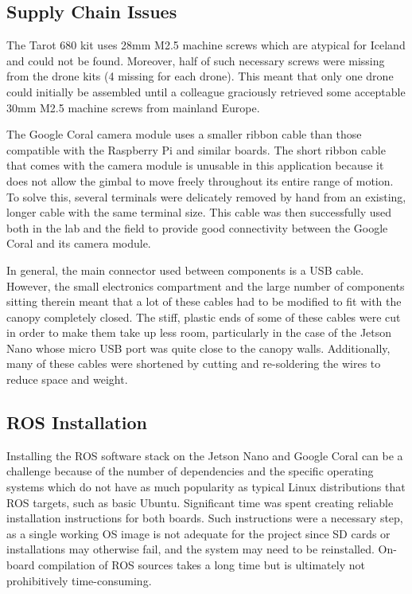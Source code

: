 \subsection{Supply Chain Issues}

The Tarot 680 kit uses 28mm M2.5 machine screws which are atypical for Iceland and could not be found. Moreover, half of such necessary screws were missing from the drone kits (4 missing for each drone). This meant that only one drone could initially be assembled until a colleague graciously retrieved some acceptable 30mm M2.5 machine screws from mainland Europe.

The Google Coral camera module uses a smaller ribbon cable than those compatible with the Raspberry Pi and similar boards. The short ribbon cable that comes with the camera module is unusable in this application because it does not allow the gimbal to move freely throughout its entire range of motion. To solve this, several terminals were delicately removed by hand from an existing, longer cable with the same terminal size. This cable was then successfully used both in the lab and the field to provide good connectivity between the Google Coral and its camera module.

In general, the main connector used between components is a USB cable. However, the small electronics compartment and the large number of components sitting therein meant that a lot of these cables had to be modified to fit with the canopy completely closed. The stiff, plastic ends of some of these cables were cut in order to make them take up less room, particularly in the case of the Jetson Nano whose micro USB port was quite close to the canopy walls. Additionally, many of these cables were shortened by cutting and re-soldering the wires to reduce space and weight.

\subsection{ROS Installation}

Installing the ROS software stack on the Jetson Nano and Google Coral can be a challenge because of the number of dependencies and the specific operating systems which do not have as much popularity as typical Linux distributions that ROS targets, such as basic Ubuntu. Significant time was spent creating reliable installation instructions for both boards. Such instructions were a necessary step, as a single working OS image is not adequate for the project since SD cards or installations may otherwise fail, and the system may need to be reinstalled. On-board compilation of ROS sources takes a long time but is ultimately not prohibitively time-consuming.


